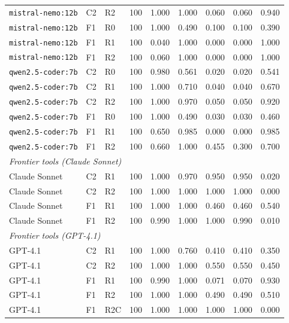 \begin{table}[tbp]
\begin{tabular}{@{}llllrrrrr@{}}
    \texttt{mistral-nemo:12b} & C2 & R2 & 100 & 1.000 & 1.000 & 0.060 & 0.060 & 0.940 \\
    \texttt{mistral-nemo:12b} & F1 & R0 & 100 & 1.000 & 0.490 & 0.100 & 0.100 & 0.390 \\
    \texttt{mistral-nemo:12b} & F1 & R1 & 100 & 0.040 & 1.000 & 0.000 & 0.000 & 1.000 \\
    \texttt{mistral-nemo:12b} & F1 & R2 & 100 & 0.060 & 1.000 & 0.000 & 0.000 & 1.000 \\
    \texttt{qwen2.5-coder:7b} & C2 & R0 & 100 & 0.980 & 0.561 & 0.020 & 0.020 & 0.541 \\
    \texttt{qwen2.5-coder:7b} & C2 & R1 & 100 & 1.000 & 0.710 & 0.040 & 0.040 & 0.670 \\
    \texttt{qwen2.5-coder:7b} & C2 & R2 & 100 & 1.000 & 0.970 & 0.050 & 0.050 & 0.920 \\
    \texttt{qwen2.5-coder:7b} & F1 & R0 & 100 & 1.000 & 0.490 & 0.030 & 0.030 & 0.460 \\
    \texttt{qwen2.5-coder:7b} & F1 & R1 & 100 & 0.650 & 0.985 & 0.000 & 0.000 & 0.985 \\
    \texttt{qwen2.5-coder:7b} & F1 & R2 & 100 & 0.660 & 1.000 & 0.455 & 0.300 & 0.700 \\
    \midrule
    \multicolumn{9}{l}{\textit{Frontier tools (Claude Sonnet)}} \\
    Claude Sonnet & C2 & R1 & 100 & 1.000 & 0.970 & 0.950 & 0.950 & 0.020 \\
    Claude Sonnet & C2 & R2 & 100 & 1.000 & 1.000 & 1.000 & 1.000 & 0.000 \\
    Claude Sonnet & F1 & R1 & 100 & 1.000 & 1.000 & 0.460 & 0.460 & 0.540 \\
    Claude Sonnet & F1 & R2 & 100 & 0.990 & 1.000 & 1.000 & 0.990 & 0.010 \\
    \midrule
    \multicolumn{9}{l}{\textit{Frontier tools (GPT-4.1)}} \\
    GPT-4.1 & C2 & R1 & 100 & 1.000 & 0.760 & 0.410 & 0.410 & 0.350 \\
    GPT-4.1 & C2 & R2 & 100 & 1.000 & 1.000 & 0.550 & 0.550 & 0.450 \\
    GPT-4.1 & F1 & R1 & 100 & 0.990 & 1.000 & 0.071 & 0.070 & 0.930 \\
    GPT-4.1 & F1 & R2 & 100 & 1.000 & 1.000 & 0.490 & 0.490 & 0.510 \\
    GPT-4.1 & F1 & R2C & 100 & 1.000 & 1.000 & 1.000 & 1.000 & 0.000 \\
    \bottomrule
  \end{tabular}
\end{table}
